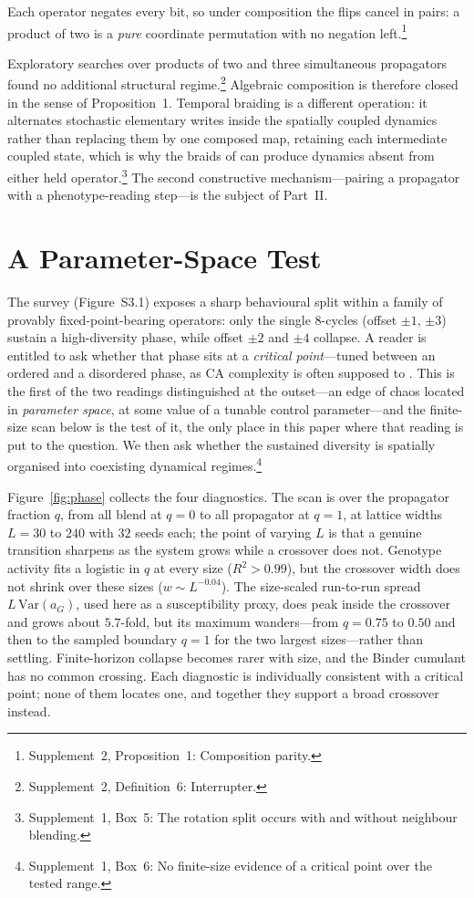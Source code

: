 \documentclass[man,12pt,floatsintext,donotrepeattitle]{apa7}
\newcommand{\secref}[1]{\emph{\nameref{#1}}}
\newcommand{\suppfindingref}[1]{Supplement~1, Box~#1}
\newcommand{\supptheorytext}[2]{Supplement~2, #1: #2.}
\newcommand{\supptheory}[2]{\footnote{\supptheorytext{#1}{#2}}}
\newcommand{\suppfindingtext}[2]{\suppfindingref{#1}: #2.}
\newcommand{\suppfinding}[2]{\footnote{\suppfindingtext{#1}{#2}}}
\begin{document}
Each operator negates every bit, so under composition the flips cancel in pairs: a product
of two is a \emph{pure} coordinate permutation with no negation left.\supptheory{Proposition~1}{Composition parity}

Exploratory searches over products of two and three simultaneous propagators
found no additional structural regime.\supptheory{Definition~6}{Interrupter}
Algebraic composition is therefore closed in the sense of
Proposition~1. Temporal braiding is a different operation: it
alternates stochastic elementary writes inside the spatially coupled dynamics
rather than replacing them by one composed map, retaining each intermediate
coupled state, which is why the braids of \secref{sec:braiding} can produce
dynamics absent from either held operator.\suppfinding{5}{The rotation split occurs with and without neighbour blending}
The second constructive mechanism---pairing a propagator with a
phenotype-reading step---is the subject of Part~II.

\section{A Parameter-Space Test}
\label{sec:discussion}

The survey (Figure~S3.1) exposes a sharp behavioural split within a
family of provably fixed-point-bearing operators: only the single 8-cycles
(offset $\pm 1$, $\pm 3$) sustain a high-diversity phase, while offset $\pm 2$ and
$\pm 4$ collapse. A reader is entitled to ask whether that phase sits at a
\emph{critical point}---tuned between an ordered and a disordered phase, as CA
complexity is often supposed to \parencite{langton1990computation}. This is the
first of the two readings distinguished at the outset---an edge of chaos located
in \emph{parameter space}, at some value of a tunable control parameter---and
the finite-size scan below is the test of it, the only place in this paper where
that reading is put to the question. We then ask
whether the sustained diversity is spatially organised into coexisting
dynamical regimes.\suppfinding{6}{No finite-size evidence of a critical point over the tested range}

Figure~\ref{fig:phase} collects the four diagnostics. The scan is over the
propagator fraction $q$, from all blend at $q=0$ to all propagator at $q=1$, at
lattice widths $L = 30$ to $240$ with $32$ seeds each; the point of varying $L$
is that a genuine transition sharpens as the system grows while a crossover does
not. Genotype activity fits a logistic in $q$ at every size ($R^2 > 0.99$), but
the crossover width does not shrink over these sizes ($w \sim L^{-0.04}$). The
size-scaled run-to-run spread $L\,\mathrm{Var}(a_G)$, used here as a
susceptibility proxy, does peak inside the crossover and grows about $5.7$-fold, but
its maximum wanders---from $q=0.75$ to $0.50$ and then to the sampled boundary
$q=1$ for the two largest sizes---rather than settling. Finite-horizon collapse
becomes rarer with size, and the Binder cumulant has no common crossing. Each
diagnostic is individually consistent with a critical point; none of them
locates one, and together they support a broad crossover instead.
\end{document}

